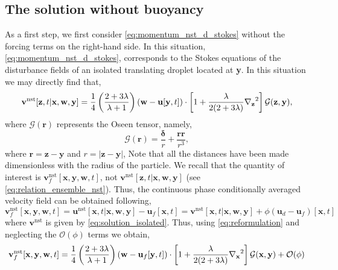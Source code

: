 \subsection{The solution without buoyancy } 

As a first step, we first consider \ref{eq:momentum_nst_d_stokes} without the forcing terms on the right-hand side. 
In this situation, \ref{eq:momentum_nst_d_stokes}, corresponds to the Stokes equations of the disturbance fields of an isolated translating droplet located at \textbf{y}. 
In this situation we may directly find that, 
\begin{equation}
    \textbf{v}^\text{nst}[\textbf{z},t|\textbf{x},\textbf{w},\textbf{y}]
    = 
    \frac{1}{4}\left(\frac{2+3\lambda}{\lambda+1}\right)(\textbf{w}- \textbf{u}[\textbf{y},t])\cdot\left[
        1
        +
        \frac{\lambda}{2(2+3\lambda)}\pddz^2 
    \right]\mathcal{G}(\textbf{z},\textbf{y}),
    \label{eq:solution_isolated}
\end{equation}
where $\mathcal{G}(\textbf{r})$ represents the Oseen tensor, namely, 
\begin{equation}
    \mathcal{G}(\textbf{r})
    = \frac{\bm\delta}{r}
    + \frac{\textbf{rr}}{r^3},
\end{equation}
where $\textbf{r} = \textbf{z} - \textbf{y}$ and $r = |\textbf{z} - \textbf{y}|$, 
Note that all the distances have been made dimensionless with the radius of the particle. 
We recall that the quantity of interest  is $\textbf{v}^\text{nst}_f[\textbf{x},\textbf{y},\textbf{w},t]$, not $\textbf{v}^\text{nst}[\textbf{z},t|\textbf{x},\textbf{w},\textbf{y}]$  (see \ref{eq:relation_ensemble_nst}). 
Thus, the continuous phase conditionally averaged velocity field can be obtained following, 
\begin{equation}
    \textbf{v}^\text{nst}_f[\textbf{x},\textbf{y},\textbf{w},t]
    = 
    \textbf{u}^\text{nst}[\textbf{x},t|\textbf{x},\textbf{w},\textbf{y}]
    - \textbf{u}_f[\textbf{x},t]
    = 
    \textbf{v}^\text{nst}[\textbf{x},t|\textbf{x},\textbf{w},\textbf{y}]
    + \phi(\textbf{u}_d - \textbf{u}_f)[\textbf{x},t]
    \label{eq:reformulation}
\end{equation}
where $\textbf{v}^\text{nst}$ is given by \ref{eq:solution_isolated}. 
Thus, using \ref{eq:reformulation} and neglecting the $\mathcal{O}(\phi)$ terms we obtain, 
\begin{equation}
    \textbf{v}^\text{nst}_f[\textbf{x},\textbf{y},\textbf{w},t]
    = 
    \frac{1}{4}\left(\frac{2+3\lambda}{\lambda+1}\right)
    (\textbf{w}- \textbf{u}_f[\textbf{y},t])\cdot\left[
        1
        +
        \frac{\lambda}{2(2+3\lambda)}\pddx^2 
    \right]\mathcal{G}(\textbf{x},\textbf{y})
    + \mathcal{O}(\phi)
    \label{eq:solution_isolated_at_x}
\end{equation}
